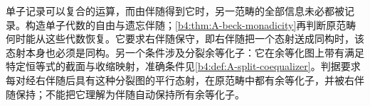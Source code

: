 \ProseParagraphBreak
单子记录可以复合的运算，而由伴随得到它时，另一范畴的全部信息未必都被记录。构造单子代数的自由与遗忘伴随；\cref{b4:thm:A-beck-monadicity}再判断原范畴何时能从这些代数恢复。它要求右伴随保守，即右伴随把一个态射送成同构时，该态射本身也必须是同构。另一个条件涉及分裂余等化子：它在余等化图上带有满足特定恒等式的截面与收缩映射，准确条件见\cref{b4:def:A-split-coequalizer}。判据要求每对经右伴随后具有这种分裂图的平行态射，在原范畴中都有余等化子，并被右伴随保持；不能把它理解为伴随自动保持所有余等化子。
